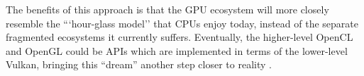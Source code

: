 \documentclass[a4paper,12pt,twoside,openright]{report}
\begin{document}
The benefits of this approach is that the GPU ecosystem will more closely
resemble the ```hour-glass model'' that CPUs enjoy today, instead of the
separate fragmented ecosystems it currently suffers. Eventually, the
higher-level OpenCL and OpenGL could be APIs which are implemented in terms of
the lower-level Vulkan, bringing this ``dream'' another step closer to reality
\cite{OpenGLonVulkan} \cite{VulkanOpenCLMerge} \cite{OpenGLOverload}.


\appendix
\singlespacing



\end{document}
